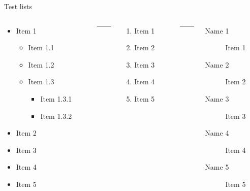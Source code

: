\documentclass[%
	debug,
	sectionpage,
    listings={
        Lean=listings-lean,
        Go
    },
	withappendix,
	english,
]{rainbow-beamer}
\begin{document}
\begin{frame}{Test lists}
	\begin{columns}
		\begin{column}{.32\linewidth}
			\begin{itemize}
				\item Item 1
				      \begin{itemize}
					      \item Item 1.1
					      \item Item 1.2
					      \item Item 1.3
					            \begin{itemize}
						            \item Item 1.3.1
						            \item Item 1.3.2
					            \end{itemize}
				      \end{itemize}
				\item Item 2
				\item Item 3
				\item Item 4
				\item Item 5
			\end{itemize}
		\end{column}
		\begin{column}{.05\linewidth}
			\centering
			\rule{.1mm}{.7\textheight}
		\end{column}
		\begin{column}{.24\linewidth}
			\begin{enumerate}
				\item Item 1
				\item Item 2
				\item Item 3
				\item Item 4
				\item Item 5
			\end{enumerate}
		\end{column}
		\begin{column}{.05\linewidth}
			\centering
			\rule{.1mm}{.7\textheight}
		\end{column}
		\begin{column}{.3\linewidth}
			\begin{description}
				\item[Name 1] Item 1
				\item[Name 2] Item 2
				\item[Name 3] Item 3
				\item[Name 4] Item 4
				\item[Name 5] Item 5
			\end{description}
		\end{column}
	\end{columns}
\end{frame}
\end{document}
